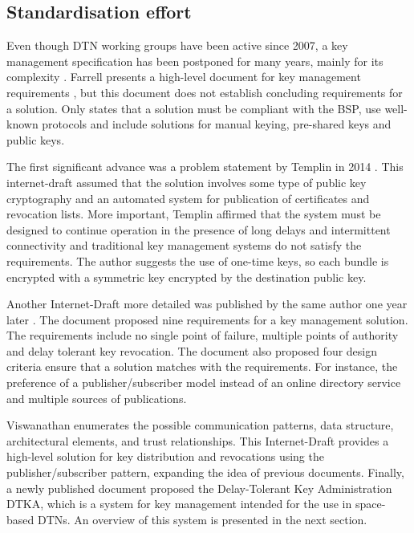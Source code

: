 \subsection{Standardisation effort}

Even though DTN working groups have been active since 2007, a key management specification has been postponed for many years, mainly for its complexity \cite{rfc6257,irtf-dtnrg-sec-overview-06,templin-dtnskmps-00}. Farrell presents a high-level document for key management requirements \cite{farrell-dtnrg-km-00}, but this document does not establish concluding requirements for a solution. Only states that a solution must be compliant with the BSP, use well-known protocols and include solutions for manual keying, pre-shared keys and public keys.  


The first significant advance was a problem statement by Templin in 2014  \cite{templin-dtnskmps-00}. This internet-draft assumed that the solution involves some type of public key cryptography and an automated system for publication of certificates and revocation lists. More important, Templin affirmed that the system must be designed to continue operation in the presence of long delays and intermittent connectivity and traditional key management systems do not satisfy the requirements. The author suggests the use of one-time keys, so each bundle is encrypted with a symmetric key encrypted by the destination public key. 

Another Internet-Draft more detailed was published by the same author one year later \cite{templin-dtnskmreq-00}. The document proposed nine requirements for a key management solution. The requirements include no single point of failure, multiple points of authority and delay tolerant key revocation. The document also proposed four design criteria ensure that a solution matches with the requirements. For instance, the preference of a publisher/subscriber model instead of an online directory service and multiple sources of publications. 

Viswanathan \cite{viswanathan-dtn-pkdn-00} enumerates the possible communication patterns, data structure, architectural elements, and trust relationships.  This Internet-Draft provides a high-level solution for key distribution and revocations using the publisher/subscriber pattern, expanding the idea of previous documents.
Finally, a newly published document proposed the Delay-Tolerant Key Administration DTKA, which is a system for key management intended for the use in space-based DTNs. An overview of this system is presented in the next section.


